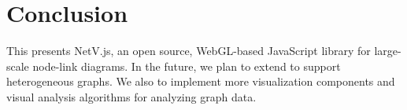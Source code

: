 \section{Conclusion}
This  presents NetV.js, an open source, WebGL-based JavaScript library for large-scale node-link diagrams. In the future, we plan to extend \name to support heterogeneous graphs. We also  to implement more visualization components and visual analysis algorithms for analyzing graph data.